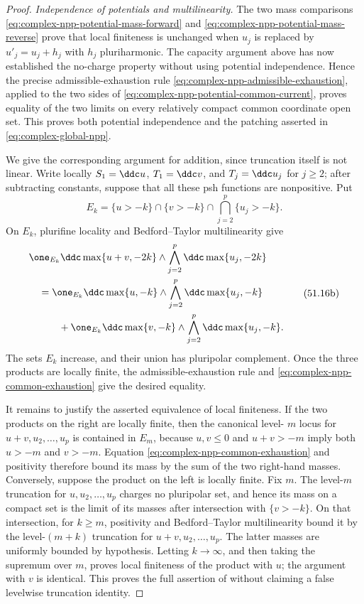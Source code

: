 \begin{proof}
\emph{Independence of potentials and multilinearity.}
The two mass comparisons
\eqref{eq:complex-npp-potential-mass-forward} and
\eqref{eq:complex-npp-potential-mass-reverse} prove that local finiteness is
unchanged when \(u_j\) is replaced by \(u'_j=u_j+h_j\) with \(h_j\)
pluriharmonic.  The capacity argument above has now established the
no-charge property without using potential independence.  Hence the precise
admissible-exhaustion rule
\eqref{eq:complex-npp-admissible-exhaustion}, applied to the two sides of
\eqref{eq:complex-npp-potential-common-current}, proves equality of the two
limits on every relatively compact common coordinate open set.  This proves
both potential independence and the patching asserted in
\eqref{eq:complex-global-npp}.

We give the corresponding argument for addition, since truncation itself is
not linear.  Write locally
\(S_1=\ddc u\), \(T_1=\ddc v\), and
\(T_j=\ddc u_j\) for \(j\geq2\); after subtracting constants, suppose that
all these psh functions are nonpositive.  Put
\[
 E_k=\{u>-k\}\cap\{v>-k\}
             \cap\bigcap_{j=2}^p\{u_j>-k\}.
\]
On \(E_k\), plurifine locality and Bedford--Taylor multilinearity give
\[
\begin{aligned}
 &\one_{E_k}\ddc\max\{u+v,-2k\}
       \wedge\bigwedge_{j=2}^p\ddc\max\{u_j,-2k\}\\
 &\quad=
 \one_{E_k}\ddc\max\{u,-k\}
       \wedge\bigwedge_{j=2}^p\ddc\max\{u_j,-k\}\\
 &\qquad\quad+
 \one_{E_k}\ddc\max\{v,-k\}
       \wedge\bigwedge_{j=2}^p\ddc\max\{u_j,-k\}.
\end{aligned}
\tag{51.16b}\label{eq:complex-npp-common-exhaustion}
\]
The sets \(E_k\) increase, and their union has pluripolar complement.  Once
the three products are locally finite, the admissible-exhaustion rule and
\eqref{eq:complex-npp-common-exhaustion} give the desired equality.

It remains to justify the asserted equivalence of local finiteness.  If the
two products on the right are locally finite, then the canonical level-
\(m\) locus for \(u+v,u_2,\ldots,u_p\) is contained in \(E_m\), because
\(u,v\leq0\) and \(u+v>-m\) imply both \(u>-m\) and \(v>-m\).
Equation \eqref{eq:complex-npp-common-exhaustion} and positivity therefore
bound its mass by the sum of the two right-hand masses.  Conversely, suppose
the product on the left is locally finite.  Fix \(m\).  The level-\(m\)
truncation for \(u,u_2,\ldots,u_p\) charges no pluripolar set, and hence its
mass on a compact set is the limit of its masses after intersection with
\(\{v>-k\}\).  On that intersection, for \(k\geq m\), positivity and
Bedford--Taylor multilinearity bound it by the level-\((m+k)\) truncation
for \(u+v,u_2,\ldots,u_p\).  The latter masses are uniformly bounded by
hypothesis.  Letting \(k\to\infty\), and then taking the supremum over
\(m\), proves local finiteness of the product with \(u\); the argument with
\(v\) is identical.  This proves the full assertion of
\cite[Proposition~1.4]{BEGZ10} without claiming a false levelwise
truncation identity.


\end{proof}
